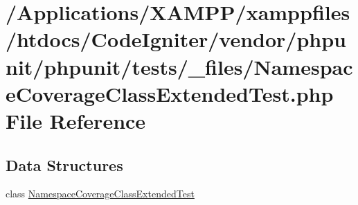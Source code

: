 \hypertarget{phpunit_2tests_2__files_2_namespace_coverage_class_extended_test_8php}{}\section{/\+Applications/\+X\+A\+M\+P\+P/xamppfiles/htdocs/\+Code\+Igniter/vendor/phpunit/phpunit/tests/\+\_\+files/\+Namespace\+Coverage\+Class\+Extended\+Test.php File Reference}
\label{phpunit_2tests_2__files_2_namespace_coverage_class_extended_test_8php}
\subsection*{Data Structures}
\begin{DoxyCompactItemize}
\item 
class \mbox{\hyperlink{class_namespace_coverage_class_extended_test}{Namespace\+Coverage\+Class\+Extended\+Test}}
\end{DoxyCompactItemize}
